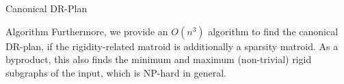 \documentclass{beamer}
\newcommand{\dfn}[1]{\alert{\textit{#1}}} %
\begin{document}
\begin{frame}{Canonical DR-Plan}

\end{frame}

\begin{frame}{Algorithm}
    Furthermore, we provide an $O(n^3)$ algorithm to find the canonical DR-plan, if the rigidity-related matroid is additionally a sparsity matroid.
\n
    As a byproduct, this also finds the minimum and maximum (non-trivial) rigid subgraphs of the input, which is NP-hard in general.
\end{frame}







\end{document}
